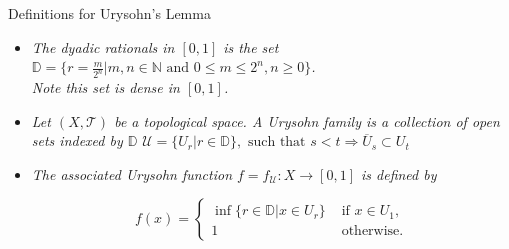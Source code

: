 \documentclass{beamer}
\begin{document}
\begin{frame}{Definitions for Urysohn's Lemma}
  \begin{itemize}
  \item {
    \textit{The dyadic rationals in $[0, 1]$ is the set $\mathbb{D} = \big\{r = \frac{m}{2^n} \vert m,n \in \mathbb{N} \text{ and } 0 \leq m \leq 2^n, n \geq 0 \big\}$.\\Note this set is dense in $[0, 1]$.}
    \pause %
  }
  \item {   
    \textit{Let $(X, \mathcal{T})$ be a topological space. A Urysohn family is a collection of open sets indexed by $\mathbb{D}$}
$\mathcal{U} = \{U_r \vert r \in \mathbb{D}\}, \text{ such that } s < t \Rightarrow \overline{U}_s \subset U_t$
  }
  \item<3-> {
    \textit{The associated Urysohn function $f = f_{\mathcal{U}} : X \rightarrow [0, 1]$ is defined by}

	\[
	f(x) = 
		\begin{cases}
			\inf \{r \in \mathbb{D} \vert x \in U_r\} & \text{ if } x \in U_1,\\
			1 & \text{ otherwise.}
		\end{cases}
	\]
  }
  \end{itemize}
\end{frame}
\end{document}
